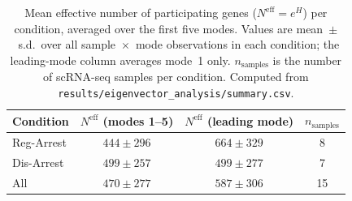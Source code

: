 \begin{table}[h!]
\centering
\caption{Mean effective number of participating genes ($N^{\mathrm{eff}} = e^{H}$) per
condition, averaged over the first five modes. Values are mean~$\pm$~s.d.\ over all
sample~$\times$~mode observations in each condition; the leading-mode column averages
mode~1 only. $n_\mathrm{samples}$ is the number of scRNA-seq samples per condition.
Computed from \texttt{results/eigenvector\_analysis/summary.csv}.}
\label{tab:eigvec}
\begin{tabular}{lccc}
\hline
\textbf{Condition} & \textbf{$N^{\mathrm{eff}}$ (modes 1--5)} & \textbf{$N^{\mathrm{eff}}$ (leading mode)} & \textbf{$n_\mathrm{samples}$} \\
\hline
Reg-Arrest & $444 \pm 296$ & $664 \pm 329$ & 8 \\
Dis-Arrest & $499 \pm 257$ & $499 \pm 277$ & 7 \\
\hline
All        & $470 \pm 277$ & $587 \pm 306$ & 15 \\
\hline
\end{tabular}
\end{table}
